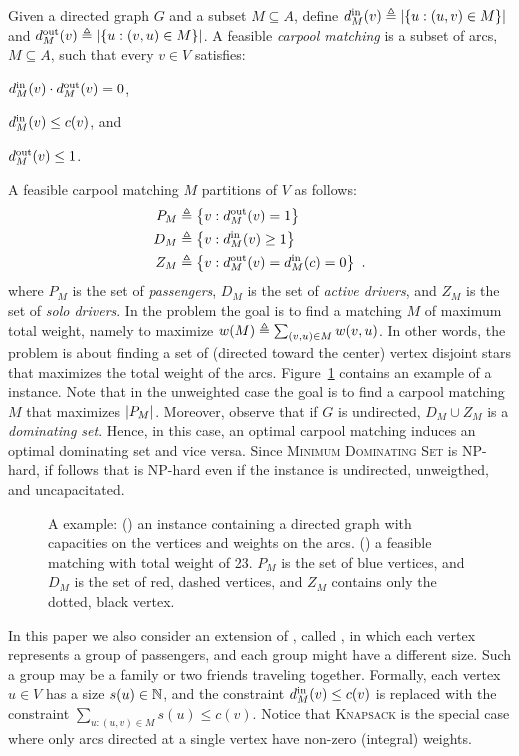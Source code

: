 Given a directed graph $G$ and a subset $M \subseteq A$, define
$\din[M](v) \eqdf \abs{\set{u :(u,v) \in M}}$ and
$\dout[M](v) \eqdf \abs{\set{u :(v,u) \in M}}$.
%
A feasible \emph{carpool matching} is a subset of arcs, $M \subseteq
A$, such that every $v \in V$ satisfies:%
\begin{inparaenum}[(i)]
\item $\din[M](v) \cdot \dout[M](v) = 0$,
\item $\din[M](v) \leq c(v)$, and 
\item $\dout[M](v) \leq 1$.
\end{inparaenum}
A feasible carpool matching $M$ partitions of $V$ as follows:
\begin{align*}
P_M & \eqdf \set{v : \dout[M](v) = 1} \\
D_M & \eqdf \set{v : \din[M](v) \geq 1} \\
Z_M & \eqdf \set{v : \dout[M](v) = \din[M](c) = 0}
~.
\end{align*}
where $P_M$ is the set of \emph{passengers}, $D_M$ is the set of
\emph{active drivers}, and $Z_M$ is the set of \emph{solo drivers}.
%
In the \carpool problem the goal is to find a matching $M$ of maximum
total weight, namely to maximize $w(M) \eqdf \sum_{(v,u) \in M}
w(v,u)$.  In other words, the \carpool problem is about finding a set
of (directed toward the center) vertex disjoint stars that maximizes
the total weight of the arcs.  
%
Figure~\ref{fig:carpool} contains an example of a \carpool instance.
%
Note that in the unweighted case the goal is to find a carpool
matching $M$ that maximizes $\abs{P_M}$.
%
Moreover, observe that if $G$ is undirected, $D_M \cup Z_M$ is
a \emph{dominating set}.  Hence, in this case, an optimal carpool
matching induces an optimal dominating set and vice versa.
Since \textsc{Minimum Dominating Set} is NP-hard, if follows
that \carpool is NP-hard even if the instance is undirected,
unweigthed, and uncapacitated.

\begin{figure}
\centering

\caption[]{
\label{fig:carpool}
A \carpool example: () an instance containing a
directed graph with capacities on the vertices and weights on the
arcs.  () a feasible matching with total weight
of 23.  $P_M$ is the set of blue vertices, and $D_M$ is the set of
red, dashed vertices, and $Z_M$ contains only the dotted, black
vertex.  }
\end{figure}  

In this paper we also consider an extension of \carpool, called \gcp,
in which each vertex represents a group of passengers, and each group
might have a different size.  Such a group may be a family or two
friends traveling together.  Formally, each vertex $u \in V$ has a
size $s(u) \in \N$, and the constraint $\din[M](v) \leq c(v)$ is
replaced with the constraint $\sum_{u:(u,v) \in M} s(u) \leq c(v)$.
%
Notice that \textsc{Knapsack} is the special case where only arcs
directed at a single vertex have non-zero (integral) weights.

